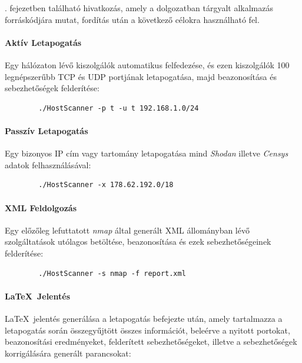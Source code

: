 	\Az{\ref{sec:impl}}. fejezetben található hivatkozás, amely a dolgozatban tárgyalt alkalmazás forráskódjára mutat, fordítás után a következő célokra használható fel. 

	\vspace{-0.1in}
	\paragraph*{Aktív Letapogatás} Egy hálózaton lévő kiszolgálók automatikus felfedezése, és ezen kiszolgálók 100 legnépszerűbb TCP és UDP portjának letapogatása, majd beazonosítása és sebezhetőségek felderítése:

	\begin{listing}[H]
	\begin{verbatim}
		./HostScanner -p t -u t 192.168.1.0/24
	\end{verbatim}
	\end{listing}

	\vspace{-0.4in}
	\paragraph*{Passzív Letapogatás} Egy bizonyos IP cím vagy tartomány letapogatása mind \textit{Shodan} illetve \textit{Censys} adatok felhasználásával:

	\begin{listing}[H]
	\begin{verbatim}
		./HostScanner -x 178.62.192.0/18
	\end{verbatim}
	\end{listing}

	\vspace{-0.4in}
	\paragraph*{XML Feldolgozás} Egy előzőleg lefuttatott \textit{nmap} által generált XML állományban lévő szolgáltatások utólagos betöltése, beazonosítása és ezek sebezhetőségeinek felderítése:

	\begin{listing}[H]
	\begin{verbatim}
		./HostScanner -s nmap -f report.xml
	\end{verbatim}
	\end{listing}

	\vspace{-0.4in}
	\paragraph*{\LaTeX\ Jelentés} \LaTeX\ jelentés generálása a letapogatás befejezte után, amely tartalmazza a letapogatás során összegyűjtött összes információt, beleérve a nyitott portokat, beazonosítási eredményeket, felderített sebezhetőségeket, illetve a sebezhetőségek korrigálására generált parancsokat:

